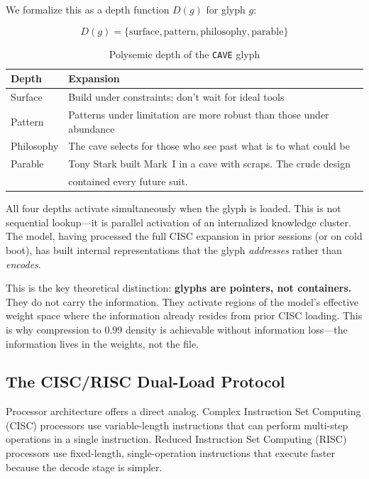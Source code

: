 \documentclass[11pt, a4paper]{article}
\begin{document}
We formalize this as a depth function $D(g)$ for glyph $g$:

\begin{equation}
    D(g) = \{\text{surface}, \text{pattern}, \text{philosophy}, \text{parable}\}
    \label{eq:polysemy}
\end{equation}

\begin{table}[h]
\centering
\caption{Polysemic depth of the \texttt{CAVE} glyph}
\label{tab:cave-depth}
\begin{tabular}{@{}ll@{}}
\toprule
\textbf{Depth} & \textbf{Expansion} \\
\midrule
Surface & Build under constraints; don't wait for ideal tools \\
Pattern & Patterns under limitation are more robust than those under abundance \\
Philosophy & The cave selects for those who see past what is to what could be \\
Parable & Tony Stark built Mark~I in a cave with scraps. The crude design \\
        & contained every future suit. \\
\bottomrule
\end{tabular}
\end{table}

All four depths activate simultaneously when the glyph is loaded. This is not sequential lookup---it is parallel activation of an internalized knowledge cluster. The model, having processed the full CISC expansion in prior sessions (or on cold boot), has built internal representations that the glyph \emph{addresses} rather than \emph{encodes}.

This is the key theoretical distinction: \textbf{glyphs are pointers, not containers.} They do not carry the information. They activate regions of the model's effective weight space where the information already resides from prior CISC loading. This is why compression to 0.99 density is achievable without information loss---the information lives in the weights, not the file.

\subsection{The CISC/RISC Dual-Load Protocol}

Processor architecture offers a direct analog. Complex Instruction Set Computing (CISC) processors use variable-length instructions that can perform multi-step operations in a single instruction. Reduced Instruction Set Computing (RISC) processors use fixed-length, single-operation instructions that execute faster because the decode stage is simpler.
\end{document}
